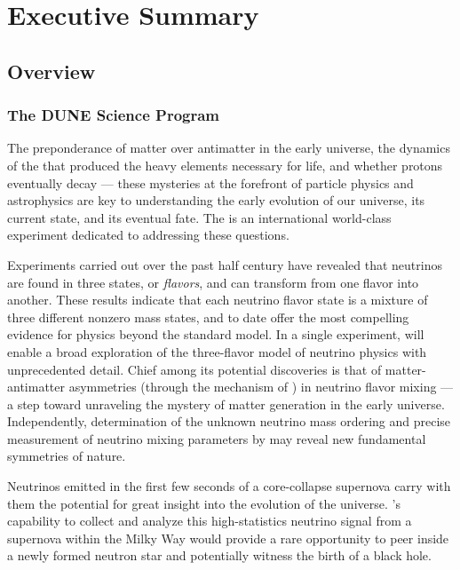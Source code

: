 \chapter{Executive Summary}
\label{ch:exec-overall}

\section{Overview}
\label{sec:exec-overall-1}

\subsection{The DUNE Science Program}

The preponderance of matter over antimatter in the early universe, the dynamics of the  that produced the heavy elements necessary for life, and whether protons eventually decay --- these mysteries at the forefront of particle physics and astrophysics are key to understanding the early evolution of our universe, its current state, and its eventual fate. The  is an international world-class experiment dedicated to addressing these questions.

Experiments carried out over the past half century have revealed that neutrinos are found in three states, or \textit{flavors}, and can transform from one flavor into another. These results indicate that each neutrino flavor state is a mixture of three different nonzero mass states, and to date offer the most compelling evidence for physics beyond the standard model. In a single experiment,  will enable a broad exploration of the three-flavor model of neutrino physics with unprecedented detail. Chief among its potential discoveries is that of matter-antimatter asymmetries (through the mechanism of ) in neutrino flavor mixing --- a step toward
unraveling the mystery of matter generation in the early universe. Independently, determination of the unknown neutrino mass ordering and precise measurement of neutrino mixing parameters by  may reveal new fundamental symmetries of nature.

Neutrinos emitted in the first few seconds of a core-collapse supernova carry with them the potential for great insight into the evolution of the universe. 's capability to collect and analyze this high-statistics neutrino signal from a supernova within the Milky Way would provide a rare opportunity to peer inside a newly formed neutron star and potentially witness the birth of a black hole.

